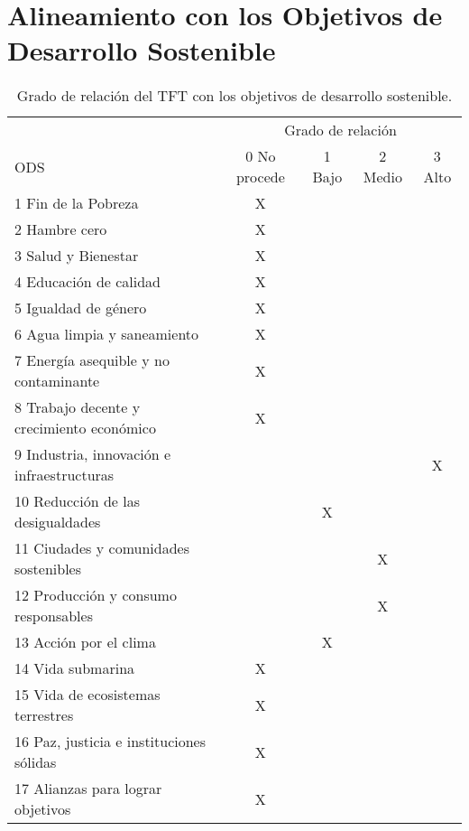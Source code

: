 \pagebreak

\section{Alineamiento con los Objetivos de Desarrollo Sostenible}
\begin{table}[!htbp]
\caption{Grado de relación del TFT con los objetivos de desarrollo sostenible.}
\label{tab:ODS}
\centering
\begin{tabular}{|l|c|c|c|c|}
\cline{1-5}
 & \multicolumn{4}{c|}{Grado de relación} \\ \cline{2-5}
ODS & 0 No procede & 1 Bajo & 2 Medio & 3 Alto \\ \cline{1-5}
1 Fin de la Pobreza                & X &   &   &   \\ \cline{1-5}
2 Hambre cero                      & X &   &   &   \\ \cline{1-5}
3 Salud y Bienestar                & X &   &   &   \\ \cline{1-5}
4 Educación de calidad             & X &   &   &   \\ \cline{1-5}
5 Igualdad de género               & X &   &   &   \\ \cline{1-5}
6 Agua limpia y saneamiento        & X &   &   &   \\ \cline{1-5}
7 Energía asequible y no contaminante & X &   &   &   \\ \cline{1-5}
8 Trabajo decente y crecimiento económico & X &   &   &   \\ \cline{1-5}
9 Industria, innovación e infraestructuras &   &   &   & X \\ \cline{1-5}
10 Reducción de las desigualdades  &   & X &   &   \\ \cline{1-5}
11 Ciudades y comunidades sostenibles &   &   & X &   \\ \cline{1-5}
12 Producción y consumo responsables &   &   & X &   \\ \cline{1-5} 
13 Acción por el clima             &   & X &   &   \\ \cline{1-5}
14 Vida submarina                  & X &   &   &   \\ \cline{1-5}
15 Vida de ecosistemas terrestres  & X &   &   &   \\ \cline{1-5}
16 Paz, justicia e instituciones sólidas & X &   &   &   \\ \cline{1-5}
17 Alianzas para lograr objetivos  & X &   &   &   \\ \cline{1-5}
\end{tabular}
\end{table}

